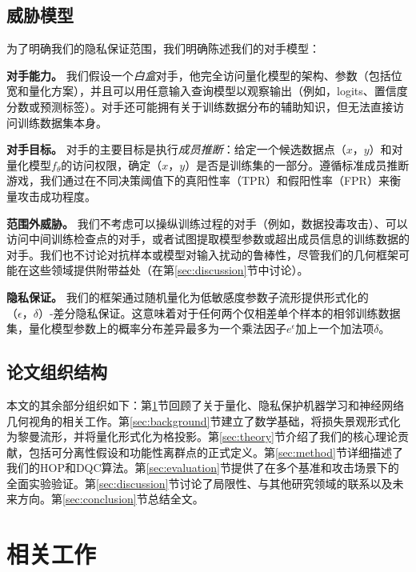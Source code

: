\documentclass[letterpaper,twocolumn,10pt]{article}
\begin{document}
\subsection{威胁模型}
\label{sec:threat_model}

为了明确我们的隐私保证范围，我们明确陈述我们的对手模型：

\textbf{对手能力。} 我们假设一个\emph{白盒}对手，他完全访问量化模型的架构、参数（包括位宽和量化方案），并且可以用任意输入查询模型以观察输出（例如，logits、置信度分数或预测标签）。对手还可能拥有关于训练数据分布的辅助知识，但无法直接访问训练数据集本身。

\textbf{对手目标。} 对手的主要目标是执行\emph{成员推断}：给定一个候选数据点$（x，y）$和对量化模型$f_\theta$的访问权限，确定$（x，y）$是否是训练集的一部分。遵循标准成员推断游戏\cite{yeom2018privacy}，我们通过在不同决策阈值下的真阳性率（TPR）和假阳性率（FPR）来衡量攻击成功程度。

\textbf{范围外威胁。} 我们不考虑可以操纵训练过程的对手（例如，数据投毒攻击）、可以访问中间训练检查点的对手，或者试图提取模型参数或超出成员信息的训练数据的对手。我们也不讨论对抗样本或模型对输入扰动的鲁棒性，尽管我们的几何框架可能在这些领域提供附带益处（在第\ref{sec:discussion}节中讨论）。

\textbf{隐私保证。} 我们的框架通过随机量化为低敏感度参数子流形提供形式化的$（\epsilon，\delta）$-差分隐私保证\cite{dwork2014algorithmic}。这意味着对于任何两个仅相差单个样本的相邻训练数据集，量化模型参数上的概率分布差异最多为一个乘法因子$e^\epsilon$加上一个加法项$\delta$。

\subsection{论文组织结构}

本文的其余部分组织如下：第\ref{sec:related}节回顾了关于量化、隐私保护机器学习和神经网络几何视角的相关工作。第\ref{sec:background}节建立了数学基础，将损失景观形式化为黎曼流形，并将量化形式化为格投影。第\ref{sec:theory}节介绍了我们的核心理论贡献，包括可分离性假设和功能性离群点的正式定义。第\ref{sec:method}节详细描述了我们的HOP和DQC算法。第\ref{sec:evaluation}节提供了在多个基准和攻击场景下的全面实验验证。第\ref{sec:discussion}节讨论了局限性、与其他研究领域的联系以及未来方向。第\ref{sec:conclusion}节总结全文。

\section{相关工作}
\label{sec:related}
\end{document}
